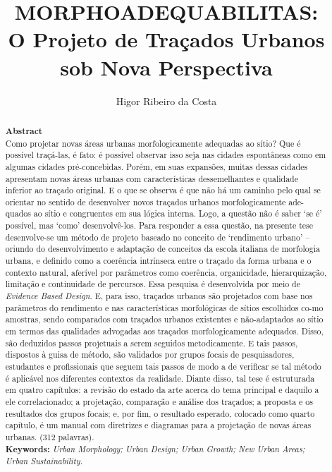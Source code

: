 \documentclass[twoside, 12pt, english,italian,latin,greek,french,spanish,brazil]{book}
\title{MORPHOADEQUABILITAS: \\ \small{O Projeto de Traçados Urbanos sob Nova Perspectiva}}
\author{Higor Ribeiro da Costa}
\begin{document}
    \maketitle
    \setcounter{secnumdepth}{1}

\begin{abstract}
        \textbf{Abstract} \\
Como projetar novas áreas urbanas morfologicamente adequadas ao sítio? Que é possível traçá-las, é fato: é possível observar isso seja nas cidades espontâneas como em algumas cidades pré-concebidas. Porém, em suas expansões, muitas dessas cidades apresentam novas áreas urbanas com características dessemelhantes e qualidade inferior ao traçado original. E o que se observa é que não há um caminho pelo qual se orientar no sentido de desenvolver novos traçados urbanos morfologicamente ade-quados ao sítio e congruentes em sua lógica interna. Logo, a questão não é saber ‘se é’ possível, mas ‘como’ desenvolvê-los.  Para responder a essa questão, na presente tese desenvolve-se um método de projeto baseado no conceito de ‘rendimento urbano’ – oriundo do desenvolvimento e adaptação de conceitos da escola italiana de morfologia urbana, e definido como a coerência intrínseca entre o traçado da forma urbana e o contexto natural, aferível por parâmetros como coerência, organicidade, hierarquização, limitação e continuidade de percursos. Essa pesquisa é desenvolvida por meio de \textit{Evidence Based Design}. E, para isso, traçados urbanos são projetados com base nos parâmetros do rendimento e nas características morfológicas de sítios escolhidos co-mo amostras, sendo comparados com traçados urbanos existentes e não-adaptados ao sítio em termos das qualidades advogadas aos traçados morfologicamente adequados. Disso, são deduzidos passos projetuais a serem seguidos metodicamente. E tais passos, dispostos à guisa de método, são validados por grupos focais de pesquisadores, estudantes e profissionais que seguem tais passos de modo a de verificar se tal método é aplicável nos diferentes contextos da realidade. Diante disso, tal tese é estruturada em quatro capítulos: a revisão do estado da arte acerca do tema principal e daquilo a ele correlacionado; a projetação, comparação e análise dos traçados; a proposta e os resultados dos grupos focais; e, por fim, o resultado esperado, colocado como quarto capítulo, é um manual com diretrizes e diagramas para a projetação de novas áreas urbanas. (312 palavras). \\
\textbf{Keywords:}
\textit{Urban Morphology; Urban Design; Urban Growth; New Urban Areas; Urban Sustainability.} 
\end{abstract}
\end{document}
